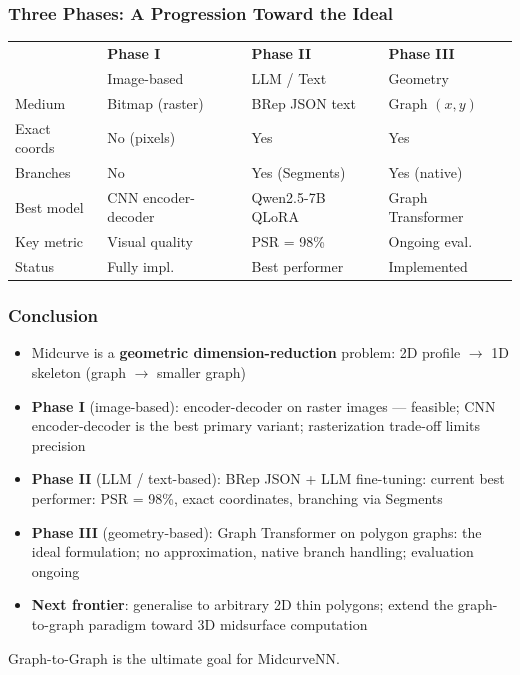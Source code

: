 \begin{frame}[fragile]\frametitle{Three Phases: A Progression Toward the Ideal}

\begin{center}
\small
\begin{tabular}{@{}p{2.0cm}p{2.4cm}p{2.4cm}p{2.4cm}@{}}
\toprule
 & \textbf{Phase I} & \textbf{Phase II} & \textbf{Phase III} \\
 & Image-based      & LLM / Text        & Geometry           \\
\midrule
Medium       & Bitmap (raster)     & BRep JSON text      & Graph $(x,y)$      \\
Exact coords & No (pixels)         & Yes                 & Yes                \\
Branches     & No                  & Yes (Segments)      & Yes (native)       \\
Best model   & CNN encoder-decoder & Qwen2.5-7B QLoRA    & Graph Transformer  \\
Key metric   & Visual quality      & PSR = 98\%          & Ongoing eval.      \\
Status       & Fully impl.         & \alert{Best performer}    & Implemented        \\
\bottomrule
\end{tabular}
\end{center}

\end{frame}

\begin{frame}[fragile]\frametitle{Conclusion}

  \begin{itemize}
    \item Midcurve is a \textbf{geometric dimension-reduction} problem: 2D profile $\rightarrow$ 1D skeleton (graph $\rightarrow$ smaller graph)
    \item \textbf{Phase I} (image-based): encoder-decoder on raster images --- feasible; CNN encoder-decoder is the best primary variant; rasterization trade-off limits precision
    \item \textbf{Phase II} (LLM / text-based): BRep JSON + LLM fine-tuning: \alert{current best performer}: PSR = 98\%, exact coordinates, branching via Segments
    \item \textbf{Phase III} (geometry-based): Graph Transformer on polygon graphs: the ideal formulation; no approximation, native branch handling; evaluation ongoing
    \item \textbf{Next frontier}: generalise to arbitrary 2D thin polygons; extend the graph-to-graph paradigm toward 3D midsurface computation
  \end{itemize}

\begin{center}
\alert{\large Graph-to-Graph is the ultimate goal for MidcurveNN.}
\end{center}

\end{frame}
